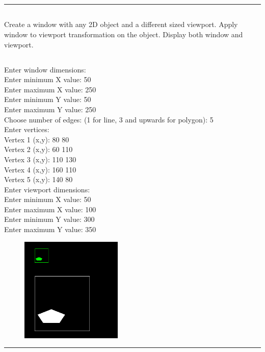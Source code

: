 \documentclass[9pt,letterpaper]{article}
\begin{document}
\newpage

\bigskip\bigskip
\hrule

\subsection*{}
\begin{flushleft}
     Create a window with any 2D object and a different sized viewport. Apply window to viewport transformation on the object. Display both window and viewport.
\end{flushleft}

\subsection*{}
\begin{flushleft}




\end{flushleft}
\newpage
\subsection*{}

Enter window dimensions: \\
Enter minimum X value: 50\\
Enter maximum X value: 250\\
Enter minimum Y value: 50\\
Enter maximum Y value: 250\\

Choose number of edges: (1 for line, 3 and upwards for polygon): 5\\
Enter vertices: \\
Vertex 1 (x,y): 80 80 \\
Vertex 2 (x,y): 60 110\\
Vertex 3 (x,y): 110 130\\
Vertex 4 (x,y): 160 110\\
Vertex 5 (x,y): 140 80\\

Enter viewport dimensions:\\ 
Enter minimum X value: 50 \\
Enter maximum X value: 100\\
Enter minimum Y value: 300\\
Enter maximum Y value: 350\\

\begin{figure}[h]
    \centering
    \includegraphics[height=5cm]{Windowing/Outputs/Windowing.png}
\end{figure}

\bigskip\bigskip
\hrule
\end{document}
